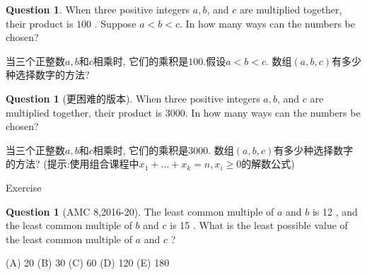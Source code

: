 \documentclass{beamer}
\theoremstyle{definition}
\newtheorem{ques}[defn]{Question}
\begin{document}
\begin{frame}
    \begin{ques}
        When three positive integers $a, b$, and $c$ are multiplied together, their product is $100$ . Suppose $a<b<c$. In how many ways can the numbers be chosen?

        当三个正整数$a,b$和$c$相乘时, 它们的乘积是$100$.假设$ a< b <c$. 数组$(a,b,c)$有多少种选择数字的方法?
    \end{ques}
    \begin{ques}[更困难的版本]
        When three positive integers $a, b$, and $c$ are multiplied together, their product is $3000$. In how many ways can the numbers be chosen?

        当三个正整数$a,b$和$c$相乘时, 它们的乘积是$3000$. 数组$(a,b,c)$有多少种选择数字的方法?
        (提示:使用组合课程中$x_1+\dots+x_k=n,x_i\ge 0$的解数公式)
    \end{ques}
\end{frame}
\begin{frame}{Exercise}
    \begin{ques}[AMC 8,2016-20]
        The least common multiple of $a$ and $b$ is 12 , and the least common multiple of $b$ and $c$ is 15 . What is the least possible value of the least common multiple of $a$ and $c$ ?
        
        (A) 20 (B) 30 (C) 60 (D) 120 (E) 180
    \end{ques}
\end{frame}
\end{document}
